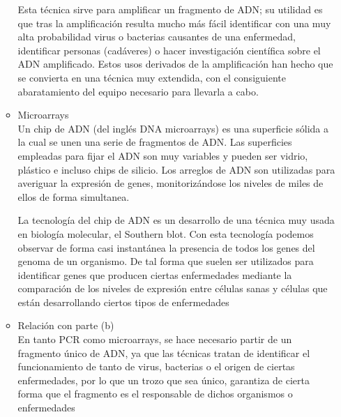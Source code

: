 \begin{enumerate}
\begin{itemize}
			Esta técnica sirve para amplificar un fragmento de ADN;
			su utilidad es que tras la amplificación resulta mucho más
			fácil identificar con una muy alta probabilidad virus o
			bacterias causantes de una enfermedad, identificar personas
			(cadáveres) o hacer investigación científica sobre el ADN
			amplificado. Estos usos derivados de la amplificación han
			hecho que se convierta en una técnica muy extendida, con el 
			consiguiente abaratamiento del equipo necesario para
			llevarla a cabo.

		\item Microarrays \\

			Un chip de ADN (del inglés DNA microarrays) es una superficie
			sólida a la cual se unen una serie de fragmentos de ADN.
			Las superficies empleadas para fijar el ADN son muy variables
			y pueden ser vidrio, plástico e incluso chips de silicio. 
			Los arreglos de ADN son utilizadas para averiguar la expresión
			de genes, monitorizándose los niveles de miles de ellos de
			forma simultanea.
			
			La tecnología del chip de ADN es un desarrollo de una técnica
			muy usada en biología molecular, el Southern blot.
			Con esta tecnología podemos observar de forma casi instantánea
			la presencia de todos los genes del genoma de un organismo.
			De tal forma que suelen ser utilizados para identificar genes
			que producen ciertas enfermedades mediante la comparación de
			los niveles de expresión entre células sanas y células que
			están desarrollando ciertos tipos de enfermedades

		\item Relación con parte (b) \\

			En tanto PCR como microarrays, se hace necesario partir de un
			fragmento único de ADN, ya que las técnicas tratan de identificar
			el funcionamiento de tanto de virus, bacterias o el origen de
			ciertas enfermedades, por lo que un trozo que sea único,
			garantiza de cierta forma que el fragmento es el responsable
			de dichos organismos o enfermedades

	\end{itemize}

\end{enumerate}
